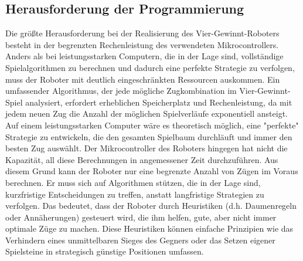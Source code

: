 \subsection{Herausforderung der Programmierung}
Die größte Herausforderung bei der Realisierung des Vier-Gewinnt-Roboters besteht in der begrenzten Rechenleistung des verwendeten Mikrocontrollers. Anders als bei leistungsstarken Computern, die in der Lage sind, vollständige Spielalgorithmen zu berechnen und dadurch eine perfekte Strategie zu verfolgen, muss der Roboter mit deutlich eingeschränkten Ressourcen auskommen.
Ein umfassender Algorithmus, der jede mögliche Zugkombination im Vier-Gewinnt-Spiel analysiert, erfordert erheblichen Speicherplatz und Rechenleistung, da mit jedem neuen Zug die Anzahl der möglichen Spielverläufe exponentiell ansteigt. Auf einem leistungsstarken Computer wäre es theoretisch möglich, eine "perfekte" Strategie zu entwickeln, die den gesamten Spielbaum durchläuft und immer den besten Zug auswählt. Der Mikrocontroller des Roboters hingegen hat nicht die Kapazität, all diese Berechnungen in angemessener Zeit durchzuführen.
Aus diesem Grund kann der Roboter nur eine begrenzte Anzahl von Zügen im Voraus berechnen. Er muss sich auf Algorithmen stützen, die in der Lage sind, kurzfristige Entscheidungen zu treffen, anstatt langfristige Strategien zu verfolgen. Das bedeutet, dass der Roboter durch Heuristiken (d.h. Daumenregeln oder Annäherungen) gesteuert wird, die ihm helfen, gute, aber nicht immer optimale Züge zu machen. Diese Heuristiken können einfache Prinzipien wie das Verhindern eines unmittelbaren Sieges des Gegners oder das Setzen eigener Spielsteine in strategisch günstige Positionen umfassen.